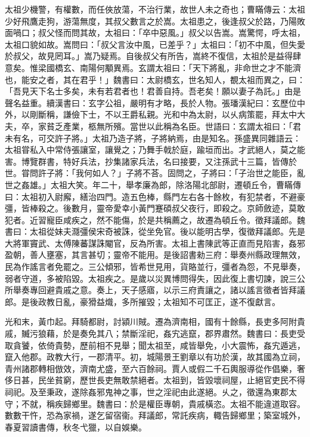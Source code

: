 \begin{pinyinscope}
太祖少機警，有權數，而任俠放蕩，不治行業，故世人未之奇也；曹瞞傳云：太祖少好飛鷹走狗，游蕩無度，其叔父數言之於嵩。太祖患之，後逢叔父於路，乃陽敗面喎口；叔父怪而問其故，太祖曰：「卒中惡風。」叔父以告嵩。嵩驚愕，呼太祖，太祖口貌如故。嵩問曰：「叔父言汝中風，已差乎？」太祖曰：「初不中風，但失愛於叔父，故見罔耳。」嵩乃疑焉。自後叔父有所告，嵩終不復信，太祖於是益得肆意矣。惟梁國橋玄、南陽何顒異焉。玄謂太祖曰：「天下將亂，非命世之才不能濟也，能安之者，其在君乎！」魏書曰：太尉橋玄，世名知人，覩太祖而異之，曰：「吾見天下名士多矣，未有若君者也！君善自持。吾老矣！願以妻子為託。」由是聲名益重。續漢書曰：玄字公祖，嚴明有才略，長於人物。張璠漢紀曰：玄歷位中外，以剛斷稱，謙儉下士，不以王爵私親。光和中為太尉，以乆病策罷，拜太中大夫，卒，家貧乏產業，柩無所殯。當世以此稱為名臣。世語曰：玄謂太祖曰：「君未有名，可交許子將。」太祖乃造子將，子將納焉，由是知名。孫盛異同雜語云：太祖甞私入中常侍張讓室，讓覺之；乃舞手戟於庭，踰垣而出。才武絕人，莫之能害。博覽群書，特好兵法，抄集諸家兵法，名曰接要，又注孫武十三篇，皆傳於世。甞問許子將：「我何如人？」子將不荅。固問之，子將曰：「子治世之能臣，亂世之姦雄。」太祖大笑。年二十，舉孝廉為郎，除洛陽北部尉，遷頓丘令，曹瞞傳曰：太祖初入尉廨，繕治四門。造五色棒，縣門左右各十餘枚，有犯禁者，不避豪彊，皆棒殺之。後數月，靈帝愛幸小黃門蹇碩叔父夜行，即殺之。京師斂迹，莫敢犯者。近習寵臣咸疾之，然不能傷，於是共稱薦之，故遷為頓丘令。徵拜議郎。魏書曰：太祖從妹夫㶏彊侯宋奇被誅，從坐免官。後以能明古學，復徵拜議郎。先是大將軍竇武、太傅陳蕃謀誅閹官，反為所害。太祖上書陳武等正直而見陷害，姦邪盈朝，善人壅塞，其言甚切；靈帝不能用。是後詔書勑三府：舉奏州縣政理無效，民為作謠言者免罷之。三公傾邪，皆希世見用，貨賂並行，彊者為怨，不見舉奏，弱者守道，多被陷毀。太祖疾之。是歲以災異博問得失，因此復上書切諫，說三公所舉奏專回避貴戚之意。奏上，天子感寤，以示三府責讓之，諸以謠言徵者皆拜議郎。是後政教日亂，豪猾益熾，多所摧毀；太祖知不可匡正，遂不復獻言。

光和末，黃巾起。拜騎都尉，討潁川賊。遷為濟南相，國有十餘縣，長吏多阿附貴戚，贓污狼藉，於是奏免其八；禁斷淫祀，姦宄逃竄，郡界肅然。魏書曰：長吏受取貪饕，依倚貴勢，歷前相不見舉；聞太祖至，咸皆舉免，小大震怖，姦宄遁逃，竄入他郡。政教大行，一郡清平。初，城陽景王劉章以有功於漢，故其國為立祠，青州諸郡轉相倣效，濟南尤盛，至六百餘祠。賈人或假二千石輿服導從作倡樂，奢侈日甚，民坐貧窮，歷世長吏無敢禁絕者。太祖到，皆毀壞祠屋，止絕官吏民不得祠祀。及至秉政，遂除姦邪鬼神之事，世之淫祀由此遂絕。乆之，徵還為東郡太守；不就，稱疾歸鄉里。魏書曰：於是權臣專朝，貴戚橫恣。太祖不能違道取容。數數干忤，恐為家禍，遂乞留宿衞。拜議郎，常託疾病，輙告歸鄉里；築室城外，春夏習讀書傳，秋冬弋獵，以自娛樂。


\end{pinyinscope}
